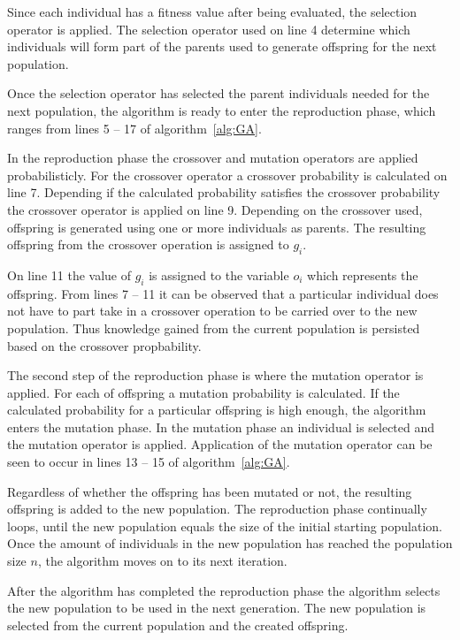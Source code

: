 Since each individual has a fitness value after being evaluated, the selection operator is applied. The selection operator used on line 4 determine which individuals will form part of the parents used to generate offspring for the next population.

Once the selection operator has selected the parent individuals needed for the next population, the algorithm is ready to enter the reproduction phase, which ranges from lines 5 -- 17 of algorithm~\ref{alg:GA}.

In the reproduction phase the crossover and mutation operators are applied probabilisticly. For the crossover operator a crossover probability is calculated on line 7. Depending if the calculated probability satisfies the crossover probability the crossover operator is applied on line 9. Depending on the crossover used, offspring is generated using one or more individuals as parents. The resulting offspring from the crossover operation is assigned to $g_i$.

On line 11 the value of $g_i$ is assigned to the variable $o_i$ which represents the offspring. From lines 7 -- 11 it can be observed that a particular individual does not have to part take in a crossover operation to be carried over to the new population. Thus knowledge gained from the current population is persisted based on the crossover propbability.

The second step of the reproduction phase is where the mutation operator is applied. For each of offspring a mutation probability is calculated. If the calculated probability for a particular offspring is high enough, the algorithm enters the mutation phase. In the mutation phase an individual is selected and the mutation operator is applied. Application of the mutation operator can be seen to occur in lines 13 -- 15 of algorithm~\ref{alg:GA}.

Regardless of whether the offspring has been mutated or not, the resulting offspring is added to the new population. The reproduction phase continually loops, until the new population equals the size of the initial starting population. Once the amount of individuals in the new population has reached the population size $n$, the algorithm moves on to its next iteration.

After the algorithm has completed the reproduction phase the algorithm selects the new population to be used in the next generation. The new population is selected from the current population and the created offspring.

